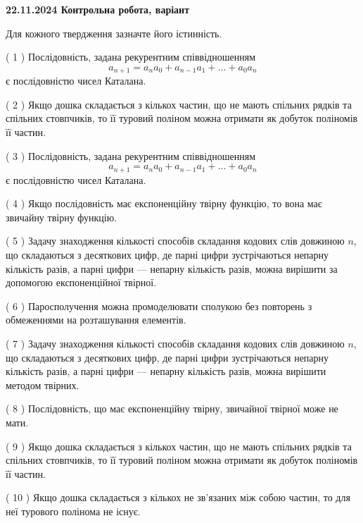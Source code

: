 \documentclass[12pt, ukrainian]{article}
\begin{document}
\vspace{4mm}
\newpage
\begin {large}

\textbf{22.11.2024 Контрольна робота, варіант  }\par


{
Для кожного твердження зазначте його істинність.\par
\vspace{2mm}
( 1 ) Послідовність, задана рекурентним співвідношенням $$a_{n+1}=a_{n}a_{0}+a_{n-1}a_{1}+\ldots+a_0a_{n}$$ є послідовністю чисел Каталана.%

( 2 ) Якщо дошка складається з кількох частин, що не мають спільних рядків та спільних стовпчиків, то її туровий поліном можна отримати як добуток поліномів її частин.%

( 3 ) Послідовність, задана рекурентним співвідношенням $$a_{n+1}=a_{n}a_{0}+a_{n-1}a_{1}+\ldots+a_0a_{n}$$ є послідовністю чисел Каталана.%

( 4 ) Якщо послідовність має експоненційну твірну функцію, то вона має звичайну твірну функцію.%

( 5 ) Задачу знаходження кількості способів складання кодових слів довжиною $n$, що складаються з десяткових цифр, де парні цифри зустрічаються непарну кількість разів, а парні цифри — непарну кількість разів, можна вирішити за допомогою експоненційної твірної.%

( 6 ) Паросполучення можна промоделювати сполукою без повторень з обмеженнями на розташування елементів.%

( 7 ) Задачу знаходження кількості способів складання кодових слів довжиною $n$, що складаються з десяткових цифр, де парні цифри зустрічаються непарну кількість разів, а парні цифри — непарну кількість разів, можна вирішити методом твірних.%

( 8 ) Послідовність, що має експоненційну твірну, звичайної твірної може не мати.%

( 9 ) Якщо дошка складається з кількох частин, що не мають спільних рядків та спільних стовпчиків, то її туровий поліном можна отримати як добуток поліномів її частин.%

( 10 ) Якщо дошка складається з кількох не зв’язаних між собою частин, то для неї турового полінома не існує.%


\vspace{5mm}
}
\end {large}
\end{document}

